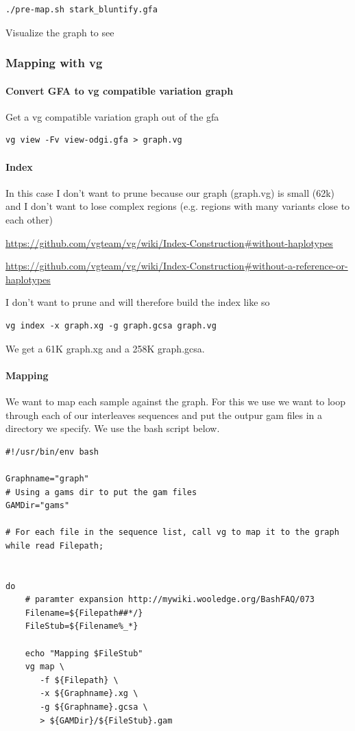 \documentclass[10pt, a4paper]{article}
\begin{document}
\begin{verbatim}
./pre-map.sh stark_bluntify.gfa
\end{verbatim}

Visualize the graph to see


\subsubsection{Mapping with vg}
\label{sec:org2c41dc4}
\paragraph{Convert GFA to vg compatible variation graph}
\label{sec:org43c58df}
Get a vg compatible variation graph out of the gfa

\begin{verbatim}
vg view -Fv view-odgi.gfa > graph.vg
\end{verbatim}

\paragraph{Index}
\label{sec:orga52959a}
In this case I don’t want to prune because our graph (graph.vg)  is small (62k) 
and I don’t want to lose complex regions 
(e.g. regions with many variants close to each other)

\url{https://github.com/vgteam/vg/wiki/Index-Construction\#without-haplotypes}

\url{https://github.com/vgteam/vg/wiki/Index-Construction\#without-a-reference-or-haplotypes}

I don’t want to prune and will therefore build the index like so

\begin{verbatim}
vg index -x graph.xg -g graph.gcsa graph.vg
\end{verbatim}

We get a 61K graph.xg and a 258K graph.gcsa.
\paragraph{Mapping}
\label{sec:org4a5b152}
We want to map each sample against the graph.
For this we use we want to loop through each of our interleaves sequences
and put the outpur gam files in a directory we specify.
We use the bash script below.

\begin{verbatim}
#!/usr/bin/env bash

Graphname="graph"
# Using a gams dir to put the gam files
GAMDir="gams"

# For each file in the sequence list, call vg to map it to the graph
while read Filepath;


do
    # paramter expansion http://mywiki.wooledge.org/BashFAQ/073
    Filename=${Filepath##*/}
    FileStub=${Filename%_*}

    echo "Mapping $FileStub"
    vg map \
       -f ${Filepath} \
       -x ${Graphname}.xg \
       -g ${Graphname}.gcsa \
       > ${GAMDir}/${FileStub}.gam
\end{verbatim}
\end{document}
